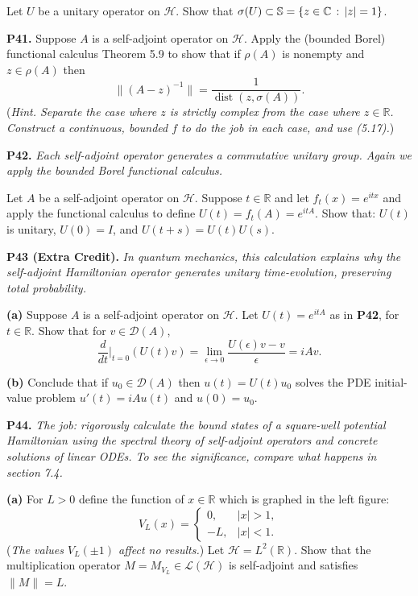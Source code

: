 \documentclass[12pt]{amsart}
\newcommand{\cD}{\mathcal{D}}
\newcommand{\cH}{\mathcal{H}}
\newcommand{\cL}{\mathcal{L}}
\newcommand{\CC}{\mathbb{C}}
\newcommand{\RR}{\mathbb{R}}
\newcommand{\eps}{\epsilon}
\newcommand{\prob}[1]{\bigskip\noindent\textbf{#1.}\quad }
\newcommand{\epart}[1]{\medskip\noindent\textbf{(#1)}\quad }
\begin{document}
\medskip\noindent Let $U$ be a unitary operator on $\cH$.  Show that $\sigma(U) \subset \SS = \{z\in\CC\,:\,|z|=1\}$.


\prob{P41}  Suppose $A$ is a self-adjoint operator on $\cH$.  Apply the (bounded Borel) functional calculus Theorem 5.9 to show that if $\rho(A)$ is nonempty and $z\in\rho(A)$ then
	$$\|(A-z)^{-1}\| = \frac{1}{\operatorname{dist}(z,\sigma(A))}.$$
(\emph{Hint. Separate the case where $z$ is strictly complex from the case where $z\in\RR$.  Construct a continuous, bounded $f$ to do the job in each case, and use (5.17).})


\clearpage\newpage
\prob{P42}  \emph{Each self-adjoint operator generates a commutative unitary group.  Again we apply the bounded Borel functional calculus.}

\medskip\noindent Let $A$ be a self-adjoint operator on $\cH$.  Suppose $t\in\RR$ and let $f_t(x) = e^{itx}$ and apply the functional calculus to define $U(t) = f_t(A) = e^{itA}$.  Show that: $U(t)$ is unitary, $U(0) = I$, and $U(t+s) = U(t) U(s)$.


\prob{P43 (Extra Credit)}  \emph{In quantum mechanics, this calculation explains why the self-adjoint Hamiltonian operator generates unitary time-evolution, preserving total probability.}

\epart{a}  Suppose $A$ is a self-adjoint operator on $\cH$.  Let $U(t) = e^{itA}$ as in \textbf{P42}, for $t\in\RR$.  Show that for $v\in\cD(A)$,
	$$\frac{d}{dt}\Big|_{t=0} (U(t)v) = \lim_{\eps\to 0} \frac{U(\eps)v-v}{\eps} = i A v.$$

\epart{b}  Conclude that if $u_0\in\cD(A)$ then $u(t) = U(t) u_0$ solves the PDE initial-value problem $u'(t) = iAu(t)$ and $u(0)=u_0$.


\prob{P44}  \emph{The job: rigorously calculate the bound states of a square-well potential Hamiltonian using the spectral theory of self-adjoint operators and concrete solutions of linear ODEs.  To see the significance, compare what happens in section 7.4.}

\epart{a}  For $L>0$ define the function of $x\in\RR$ which is graphed in the left figure:
	$$V_L(x) = \begin{cases} 0, & |x|>1, \\ -L, & |x|<1. \end{cases}$$
(\emph{The values $V_L(\pm 1)$ affect no results.})  Let $\cH=L^2(\RR)$.  Show that the multiplication operator $M = M_{V_L}\in\cL(\cH)$ is self-adjoint and satisfies $\|M\|=L$.
\end{document}
